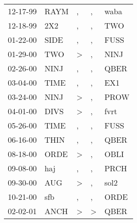 \begin{supertabular}{p{0.07\textwidth}p{0.06\textwidth}p{0.02\textwidth}p{0.02\textwidth}p{0.06\textwidth}}
 12-17-99\textsuperscript{} &           RAYM\textsuperscript{} &             , &             , &  waba\textsuperscript{} \\
 12-18-99\textsuperscript{} &            2X2\textsuperscript{} &             , &             , &   TWO\textsuperscript{} \\
 01-22-00\textsuperscript{} &           SIDE\textsuperscript{} &             , &             , &  FUSS\textsuperscript{} \\
 01-29-00\textsuperscript{} &            TWO\textsuperscript{} &  \textgreater &             , &  NINJ\textsuperscript{} \\
 02-26-00\textsuperscript{} &           NINJ\textsuperscript{} &             , &             , &  QBER\textsuperscript{} \\
 03-04-00\textsuperscript{} &           TIME\textsuperscript{} &             , &             , &   EX1\textsuperscript{} \\
 03-24-00\textsuperscript{} &           NINJ\textsuperscript{} &  \textgreater &             , &  PROW\textsuperscript{} \\
 04-01-00\textsuperscript{} &           DIVS\textsuperscript{} &  \textgreater &             , &  fvrt\textsuperscript{} \\
 05-26-00\textsuperscript{} &           TIME\textsuperscript{} &             , &             , &  FUSS\textsuperscript{} \\
 06-16-00\textsuperscript{} &           THIN\textsuperscript{} &             , &             , &  QBER\textsuperscript{} \\
 08-18-00\textsuperscript{} &           ORDE\textsuperscript{} &  \textgreater &             , &  OBLI\textsuperscript{} \\
 09-08-00\textsuperscript{} &            haj\textsuperscript{} &             , &             , &  PRCH\textsuperscript{} \\
 09-30-00\textsuperscript{} &            AUG\textsuperscript{} &  \textgreater &             , &  sol2\textsuperscript{} \\
 10-21-00\textsuperscript{} &            sfb\textsuperscript{} &             , &             , &  ORDE\textsuperscript{} \\
 02-02-01\textsuperscript{} &           ANCH\textsuperscript{} &  \textgreater &  \textgreater &  QBER\textsuperscript{} \\

\end{supertabular}
